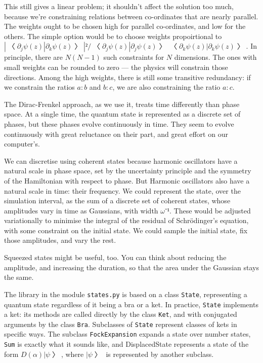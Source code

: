 This still gives a linear problem; it shouldn't affect the solution too much, because we're constraining relations between co-ordinates that are nearly parallel.  The weights ought to be chosen high for parallel co-ordinates, and low for the others.  The simple option would be to choose weights propoirtional to $|〈∂_jψ(z)|∂_kψ(z)〉|²/〈∂_jψ(z)|∂_jψ(z)〉〈∂_kψ(z)|∂_kψ(z)〉$.  In principle, there are $N(N-1)$ such constraints for $N$ dimensions.  The ones with small weights can be rounded to zero --- the physics will constrain those directions.  Among the high weights, there is still some transitive redundancy: if we constrain the ratios $a:b$ and $b:c$, we are also constraining the ratio $a:c$.


The Dirac-Frenkel approach, as we use it, treats time differently than phase space.  At a single time, the quantum state is represented as a discrete set of phases, but these phases evolve continuously in time.  They seem to evolve continuously with great reluctance on their part, and great effort on our computer's.

We can discretise using coherent states because harmonic oscillators have a natural scale in phase space, set by the uncertainty principle and the symmetry of the Hamiltonian with respect to phase.  But Harmonic oscillators also have a natural scale in time: their frequency.  We could represent the state, over the simulation interval, as the sum of a discrete set of coherent states, whose amplitudes vary in time as Gaussians, with width $ω⁻¹$.  These would be adjusted variationally to minimise the integral of the residual of Schrödinger's equation, with some constraint on the initial state.  We could sample the initial state, fix those amplitudes, and vary the rest.

Squeezed states might be useful, too.  You can think about reducing the amplitude, and increasing the duration, so that the area under the Gaussian stays the same.



The library in the module {\tt states.py} is based on a class {\tt State}, representing a quantum state regardless of it being a bra or a ket.  In practice, {\tt State} implements a ket: its methods are called directly by the class {\tt Ket}, and with conjugated arguments by the class {\tt Bra}.  Subclasses of {\tt State} represent classes of kets in specific ways.  The subclass {\tt FockExpansion} expands a state over number states, {\tt Sum} is exactly what it sounds like, and {DisplacedState} represents a state of the form $D(α)|ψ〉$, where $|ψ〉$ is represented by another subclass.

